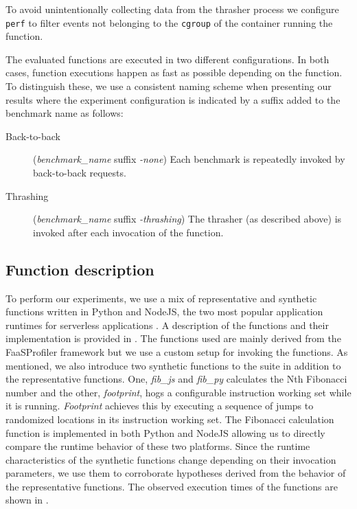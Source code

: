 To avoid unintentionally collecting data from the thrasher process we configure \texttt{perf} to filter events not belonging to the \texttt{cgroup} of the container running the function.

The evaluated functions are executed in two different configurations. In both cases, function executions happen as fast as possible depending on the function. To distinguish these, we use a consistent naming scheme when presenting our results where the experiment configuration is indicated by a suffix added to the benchmark name as follows:
\begin{description}
\item[Back-to-back]  (\textit{benchmark\_name} suffix \textit{-none}) Each benchmark is repeatedly invoked by back-to-back requests.
\item[Thrashing] (\textit{benchmark\_name} suffix \textit{-thrashing})  The thrasher (as described above) is invoked after each invocation of the function.
\end{description}


\subsection{Function description}
\label{subsec:work_desc}
To perform our experiments, we use a mix of representative and synthetic functions written in Python and NodeJS, the two most popular application runtimes for serverless applications \cite{serverless_state}. A description of the functions and their implementation is provided in . The functions used are mainly derived from the FaaSProfiler framework \cite{shahrad19_archit_implic_funct_servic_comput} but we use a custom setup for invoking the functions. As mentioned, we also introduce two synthetic functions to the suite in addition to the representative functions. One, \emph{fib\_js} and \emph{fib\_py} calculates the Nth Fibonacci number and the other, \emph{footprint}, hogs a configurable instruction working set while it is running. \emph{Footprint} achieves this by executing a sequence of jumps to randomized locations in its instruction working set. The Fibonacci calculation function is implemented in both Python and NodeJS allowing us to directly compare the runtime behavior of these two platforms. Since the runtime characteristics of the synthetic functions change depending on their invocation parameters, we use them to corroborate hypotheses derived from the behavior of the representative functions. The observed execution times of the functions are shown in .

\label{subsec:footprint}



